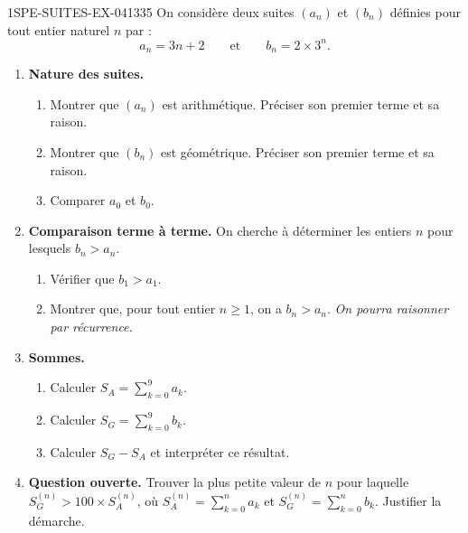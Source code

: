 \begin{exercice}{1SPE-SUITES-EX-041}{3}{35}
On considère deux suites $(a_n)$ et $(b_n)$ définies pour tout entier naturel $n$ par :
\[
  a_n = 3n + 2 \qquad \text{et} \qquad b_n = 2 \times 3^n.
\]

\begin{enumerate}
  \item \textbf{Nature des suites.}
  \begin{enumerate}
    \item Montrer que $(a_n)$ est arithmétique. Préciser son premier terme et sa raison.
    \item Montrer que $(b_n)$ est géométrique. Préciser son premier terme et sa raison.
    \item Comparer $a_0$ et $b_0$.
  \end{enumerate}

  \item \textbf{Comparaison terme à terme.} On cherche à déterminer les entiers $n$ pour lesquels $b_n > a_n$.
  \begin{enumerate}
    \item Vérifier que $b_1 > a_1$.
    \item Montrer que, pour tout entier $n \geq 1$, on a $b_n > a_n$. \textit{On pourra raisonner par récurrence.}
  \end{enumerate}

  \item \textbf{Sommes.}
  \begin{enumerate}
    \item Calculer $S_A = \displaystyle\sum_{k=0}^{9} a_k$.
    \item Calculer $S_G = \displaystyle\sum_{k=0}^{9} b_k$.
    \item Calculer $S_G - S_A$ et interpréter ce résultat.
  \end{enumerate}

  \item \textbf{Question ouverte.} Trouver la plus petite valeur de $n$ pour laquelle $S_G^{(n)} > 100 \times S_A^{(n)}$, où $S_A^{(n)} = \displaystyle\sum_{k=0}^{n} a_k$ et $S_G^{(n)} = \displaystyle\sum_{k=0}^{n} b_k$. Justifier la démarche.
\end{enumerate}
\end{exercice}
